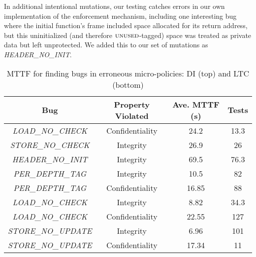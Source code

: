 \documentclass[10pt,conference]{ieeetran}%
\theoremstyle{definition}
\begin{document}
In additional intentional mutations, our testing catches errors in our
own implementation of the enforcement mechanism, including one interesting
bug where the initial function's frame included space allocated for its
return address, but this uninitialized (and therefore \(\textsc{unused}\)-tagged)
space was treated as private data but left unprotected. We added this to
our set of mutations as {\em HEADER\_NO\_INIT}.

\begin{table}[]
\centering
\begin{tabular}{c|c|c|c}
  Bug & Property Violated & Ave. MTTF (s) & Tests \\
  \hline
      {\em LOAD\_NO\_CHECK}  & Confidentiality & 24.2 & 13.3 \\
      {\em STORE\_NO\_CHECK} & Integrity & 26.9 & 26 \\
      {\em HEADER\_NO\_INIT} & Integrity & 69.5 & 76.3 \\
  \hline
  \hline
      {\em PER\_DEPTH\_TAG} & Integrity & 10.5 & 82 \\
      {\em PER\_DEPTH\_TAG} & Confidentiality & 16.85 & 88 \\
      {\em LOAD\_NO\_CHECK}  & Integrity & 8.82 & 34.3 \\
      {\em LOAD\_NO\_CHECK}  & Confidentiality & 22.55 & 127 \\
      {\em STORE\_NO\_UPDATE} & Integrity & 6.96 & 101 \\
      {\em STORE\_NO\_UPDATE} & Confidentiality & 17.34 & 11 \\
  \hline
\end{tabular}
\vspace*{1em}
\caption{MTTF for finding bugs in erroneous micro-policies: DI (top) and LTC (bottom)}
\vspace*{-2em}
\label{tab:bug-table}
\end{table}
\end{document}
